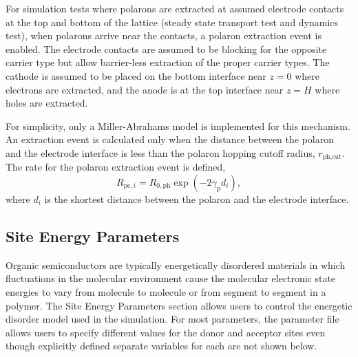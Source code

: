 \documentclass[%
 reprint,onecolumn,notitlepage,
superscriptaddress,longbibliography,
 amsmath,amssymb,
 aps,rmp,floatfix,
]{revtex4-1}
\begin{document}
For simulation tests where polarons are extracted at assumed electrode contacts at the top and bottom of the lattice (steady state transport test and dynamics test), when polarons arrive near the contacts, a polaron extraction event is enabled. 
The electrode contacts are assumed to be blocking for the opposite carrier type but allow barrier-less extraction of the proper carrier types.  
The cathode is assumed to be placed on the bottom interface near $z=0$ where electrons are extracted, and the anode is at the top interface near $z=H$ where holes are extracted.

For simplicity, only a Miller-Abrahams model is implemented for this mechanism. 
An extraction event is calculated only when the distance between the polaron and the electrode interface is less than the polaron hopping cutoff radius, $r_{\text{ph,cut}}$. The rate for the polaron extraction event is defined,
$$R_{\text{pe},i} = R_{0,\text{ph}} \exp{\left(- 2 \gamma_{\text{p}} d_{i} \right)},$$
where $d_{i}$ is the shortest distance between the polaron and the electrode interface.

\subsection{Site Energy Parameters}

Organic semiconductors are typically energetically disordered materials in which fluctuations in the molecular environment cause the molecular electronic state energies to vary from molecule to molecule or from segment to segment in a polymer.
The Site Energy Parameters section allows users to control the energetic disorder model used in the simulation.
For most parameters, the parameter file allows users to specify different values for the donor and acceptor sites even though explicitly defined separate variables for each are not shown below.
\end{document}
